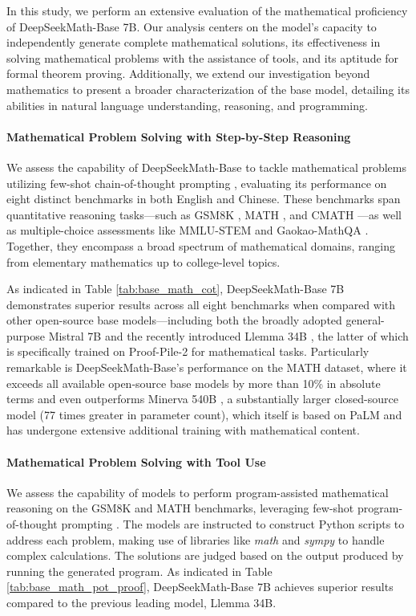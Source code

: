 \begin{itemize}[topsep=0pt]
In this study, we perform an extensive evaluation of the mathematical proficiency of DeepSeekMath-Base 7B. Our analysis centers on the model's capacity to independently generate complete mathematical solutions, its effectiveness in solving mathematical problems with the assistance of tools, and its aptitude for formal theorem proving. Additionally, we extend our investigation beyond mathematics to present a broader characterization of the base model, detailing its abilities in natural language understanding, reasoning, and programming.

\paragraph{Mathematical Problem Solving with Step-by-Step Reasoning}

We assess the capability of DeepSeekMath-Base to tackle mathematical problems utilizing few-shot chain-of-thought prompting \citep{cot}, evaluating its performance on eight distinct benchmarks in both English and Chinese. These benchmarks span quantitative reasoning tasks—such as GSM8K \citep{gsm8k}, MATH \citep{MATH}, and CMATH \citep{wei2023cmath}—as well as multiple-choice assessments like MMLU-STEM \citep{mmlu} and Gaokao-MathQA \citep{agieval}. Together, they encompass a broad spectrum of mathematical domains, ranging from elementary mathematics up to college-level topics.

As indicated in Table \ref{tab:base_math_cot}, DeepSeekMath-Base 7B demonstrates superior results across all eight benchmarks when compared with other open-source base models—including both the broadly adopted general-purpose Mistral 7B \citep{mistral} and the recently introduced Llemma 34B \citep{llemma}, the latter of which is specifically trained on Proof-Pile-2 \citep{llemma} for mathematical tasks. Particularly remarkable is DeepSeekMath-Base’s performance on the MATH dataset, where it exceeds all available open-source base models by more than 10\% in absolute terms and even outperforms Minerva 540B \citep{minerva}, a substantially larger closed-source model (77 times greater in parameter count), which itself is based on PaLM \citep{palm} and has undergone extensive additional training with mathematical content.

\paragraph{Mathematical Problem Solving with Tool Use} We assess the capability of models to perform program-assisted mathematical reasoning on the GSM8K and MATH benchmarks, leveraging few-shot program-of-thought prompting \citep{pot,pal}. The models are instructed to construct Python scripts to address each problem, making use of libraries like \textit{math} and \textit{sympy} to handle complex calculations. The solutions are judged based on the output produced by running the generated program. As indicated in Table \ref{tab:base_math_pot_proof}, DeepSeekMath-Base 7B achieves superior results compared to the previous leading model, Llemma 34B.


\end{itemize}
